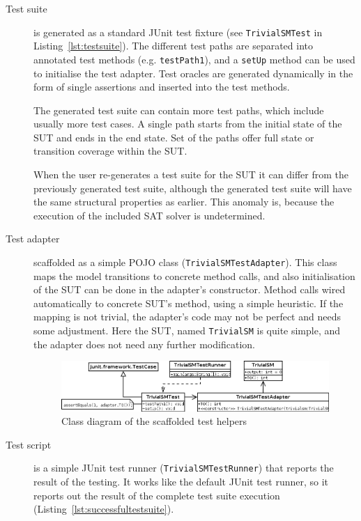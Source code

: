 \begin{description}
	\item[Test suite] is generated as a standard JUnit test fixture (see \texttt{TrivialSMTest} in Listing~\ref{lst:testsuite}). The different test paths are separated into annotated test methods (e.g. \texttt{testPath1}), and a \texttt{setUp} method can be used to initialise the test adapter. Test oracles are generated dynamically in the form of single assertions and inserted into the test methods.
	
	The generated test suite can contain more test paths, which include usually more test cases. A single path starts from the initial state of the SUT and ends in the end state. Set of the paths offer full state or transition coverage within the SUT.
	
	When the user re-generates a test suite for the SUT it can differ from the previously generated test suite, although the generated test suite will have the same structural properties as earlier. This anomaly is, because the execution of the included SAT solver is undetermined.
	\item[Test adapter] scaffolded as a simple POJO class (\texttt{TrivialSMTestAdapter}). This class maps the model transitions to concrete method calls, and also initialisation of the SUT can be done in the adapter's constructor. Method calls wired automatically to concrete SUT's method, using a simple heuristic. If the mapping is not trivial, the adapter's code may not be perfect and needs some adjustment. Here the SUT, named \texttt{TrivialSM} is quite simple, and the adapter does not need any further modification.
	
\begin{figure}[htp]
\centering
\includegraphics[scale=0.45]{figures/implementation_testhelpers}
\caption{Class diagram of the scaffolded test helpers}
\label{fig:implementation_testhelpers}
\end{figure}

	\item[Test script] is a simple JUnit test runner (\texttt{TrivialSMTestRunner}) that reports the result of the testing. It works like the default JUnit test runner, so it reports out the result of the complete test suite execution (Listing~\ref{lst:successfultestsuite}).


\end{description}
